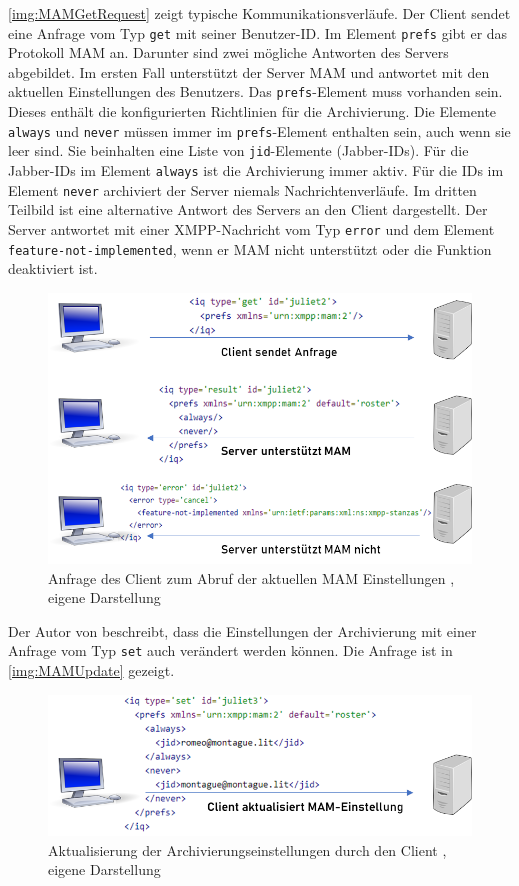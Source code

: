 \documentclass[a4paper,titlepage,halfparskip,12pt]{scrreprt}
\begin{document}
\begin{onehalfspacing}
\newpage

\autoref{img:MAMGetRequest} zeigt typische Kommunikationsverläufe. Der Client sendet eine Anfrage vom Typ \texttt{get} mit seiner Benutzer-ID. Im Element \texttt{prefs} gibt er das Protokoll \ac{MAM} an. Darunter sind zwei mögliche Antworten des Servers abgebildet. Im ersten Fall unterstützt der Server \ac{MAM} und antwortet mit den aktuellen Einstellungen des Benutzers. Das \texttt{prefs}-Element muss vorhanden sein. Dieses enthält die konfigurierten Richtlinien für die Archivierung. Die Elemente \texttt{always} und \texttt{never} müssen immer im \texttt{prefs}-Element enthalten sein, auch wenn sie leer sind. Sie beinhalten eine Liste von \texttt{jid}-Elemente (Jabber-IDs). Für die Jabber-IDs im Element \texttt{always} ist die Archivierung immer aktiv. Für die IDs im Element \texttt{never} archiviert der Server niemals Nachrichtenverläufe. Im dritten Teilbild ist eine alternative Antwort des Servers an den Client dargestellt. Der Server antwortet mit einer \ac{XMPP}-Nachricht vom Typ \texttt{error} und dem Element \texttt{feature-not-implemented}, wenn er \ac{MAM} nicht unterstützt oder die Funktion deaktiviert ist.\cite{xepMAM}

\begin{figure}[h]
\centering
\includegraphics[width=.7\linewidth]{images/XEP0313_GetRequest}
\caption{Anfrage des Client zum Abruf der aktuellen \ac{MAM} Einstellungen \cite{xepMAM}, eigene Darstellung}
\label{img:MAMGetRequest}
\end{figure}

Der Autor von \cite{xepMAM} beschreibt, dass die Einstellungen der Archivierung mit einer Anfrage vom Typ \texttt{set} auch verändert werden können. Die Anfrage ist in \autoref{img:MAMUpdate} gezeigt.

\begin{figure}[h]
\centering
\includegraphics[width=.8\linewidth]{images/XEP0313_UpdateRequest}
\caption{Aktualisierung der Archivierungseinstellungen durch den Client \cite{xepMAM}, eigene Darstellung}
\label{img:MAMUpdate}
\end{figure}


\end{onehalfspacing}
\end{document}
